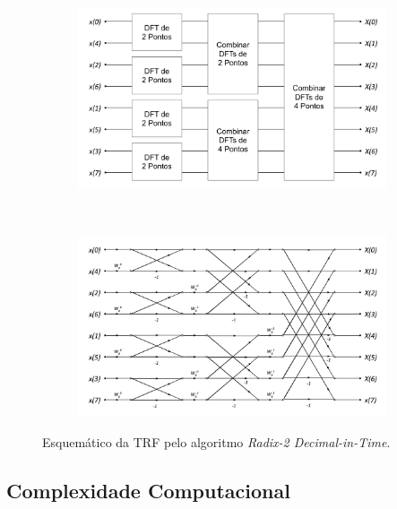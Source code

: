 \documentclass[a4paper,11pt]{article}
\numberwithin{figure}{section}
\numberwithin{equation}{section}
\numberwithin{table}{section}
\theoremstyle{definition}
\begin{document}
\begin{figure}[!ht] \centering
	\begin{subfigure}{0.95\textwidth} \centering
		\includegraphics[width=\textwidth]{radix2a}
		\caption{}
		\label{fig:radix2a}
	\end{subfigure}\\
	
	\begin{subfigure}{0.95\textwidth} \centering
		\includegraphics[width=\textwidth]{radix2b}
		\caption{}
		\label{fig:radix2b}
	\end{subfigure}
	
	\caption{Esquemático da TRF pelo algoritmo \textit{Radix-2 Decimal-in-Time}.}
	\label{fig:radix2}
\end{figure}

\subsection{Complexidade Computacional}
\end{document}
